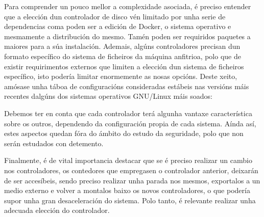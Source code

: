 \begin{enumerate}
    Para comprender un pouco mellor a complexidade asociada, é preciso entender que a elección dun controlador de disco vén limitado por unha serie de dependencias coma poden ser a edición de Docker, o sistema operativo e mesmamente a distribución do mesmo. Tamén poden ser requiridos paquetes a maiores para a súa instalación. Ademais, algúns controladores precisan dun formato específico do sistema de ficheiros da máquina anfitrioa, polo que de existir requirimentos externos que limiten a elección dun sistema de ficheiros específico, isto podería limitar enormemente as nosas opcións. Deste xeito, amósase unha táboa de configuracións consideradas estábeis nas versións máis recentes dalgúns dos sistemas operativos GNU/Linux máis soados:

\begin{table}[H]
\centering
\caption{Configuracións de controladores de almacenamento}
\label{conf-controladores-almacenamento}
\end{table}
    
    Debemos ter en conta que cada controlador terá algunha vantaxe característica sobre os outros, dependendo da configuración propia de cada sistema. Aínda así, estes aspectos quedan fóra do ámbito do estudo da seguridade, polo que non serán estudados con detemento.
    
    Finalmente, é de vital importancia destacar que se é preciso realizar un cambio nos controladores, os contedores que empregasen o controlador anterior, deixarán de ser accesíbeis, sendo preciso realizar unha parada nos mesmos, exportalos a un medio externo e volver a montalos baixo os novos controladores, o que podería supor unha gran desaceleración do sistema. Polo tanto, é relevante realizar unha adecuada elección do controlador.
    
\end{enumerate}

